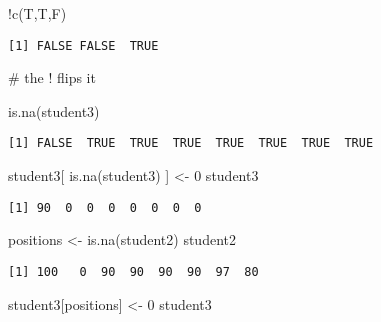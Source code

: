 \documentclass[
  letterpaper,
  DIV=11,
  numbers=noendperiod]{scrartcl}
\newenvironment{Shaded}{\begin{snugshade}}{\end{snugshade}}
\newcommand{\CommentTok}[1]{\textcolor[rgb]{0.37,0.37,0.37}{#1}}
\newcommand{\DecValTok}[1]{\textcolor[rgb]{0.68,0.00,0.00}{#1}}
\newcommand{\FunctionTok}[1]{\textcolor[rgb]{0.28,0.35,0.67}{#1}}
\newcommand{\NormalTok}[1]{\textcolor[rgb]{0.00,0.23,0.31}{#1}}
\newcommand{\OtherTok}[1]{\textcolor[rgb]{0.00,0.23,0.31}{#1}}
\newcommand{\SpecialCharTok}[1]{\textcolor[rgb]{0.37,0.37,0.37}{#1}}
\begin{document}
\begin{Shaded}
\begin{Highlighting}[]
\SpecialCharTok{!}\FunctionTok{c}\NormalTok{(T,T,F)}
\end{Highlighting}
\end{Shaded}

\begin{verbatim}
[1] FALSE FALSE  TRUE
\end{verbatim}

\begin{Shaded}
\begin{Highlighting}[]
\CommentTok{\# the ! flips it}
\end{Highlighting}
\end{Shaded}

\begin{Shaded}
\begin{Highlighting}[]
\FunctionTok{is.na}\NormalTok{(student3)}
\end{Highlighting}
\end{Shaded}

\begin{verbatim}
[1] FALSE  TRUE  TRUE  TRUE  TRUE  TRUE  TRUE  TRUE
\end{verbatim}

\begin{Shaded}
\begin{Highlighting}[]
\NormalTok{student3[ }\FunctionTok{is.na}\NormalTok{(student3) ] }\OtherTok{\textless{}{-}} \DecValTok{0}
\NormalTok{student3}
\end{Highlighting}
\end{Shaded}

\begin{verbatim}
[1] 90  0  0  0  0  0  0  0
\end{verbatim}

\begin{Shaded}
\begin{Highlighting}[]
\NormalTok{positions }\OtherTok{\textless{}{-}} \FunctionTok{is.na}\NormalTok{(student2)}
\NormalTok{student2}
\end{Highlighting}
\end{Shaded}

\begin{verbatim}
[1] 100   0  90  90  90  90  97  80
\end{verbatim}

\begin{Shaded}
\begin{Highlighting}[]
\NormalTok{student3[positions] }\OtherTok{\textless{}{-}} \DecValTok{0}
\NormalTok{student3}
\end{Highlighting}
\end{Shaded}
\end{document}
